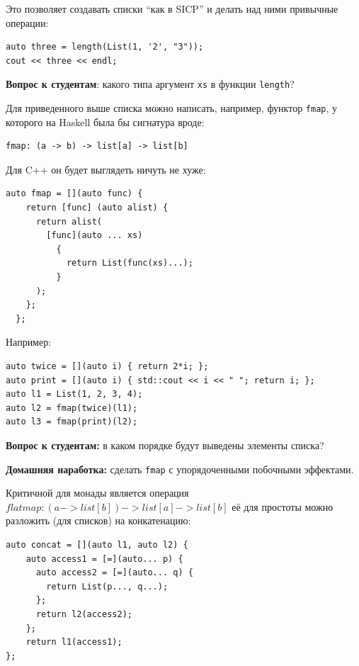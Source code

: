 \documentclass[a4paper,12pt,oneside]{article}
\newif\ifanswers
\begin{document}
Это позволяет создавать списки ``как в SICP'' и делать над ними привычные операции:

\begin{lstlisting}
auto three = length(List(1, '2', "3")); 
cout << three << endl;
\end{lstlisting}

\textbf{Вопрос к студентам}: какого типа аргумент \lstinline!xs! в функции \lstinline!length!?

\ifanswers
Правильный ответ: \lstinline!std::function!
\fi

Для приведенного выше списка можно написать, например, функтор \lstinline!fmap!, у которого на Haskell была бы сигнатура вроде:

\begin{verbatim}
fmap: (a -> b) -> list[a] -> list[b]
\end{verbatim}

Для C++ он будет выглядеть ничуть не хуже:

\begin{lstlisting}
auto fmap = [](auto func) {
    return [func] (auto alist) {
      return alist(
        [func](auto ... xs)
          {
            return List(func(xs)...);  
          }
      );
    };
  };
\end{lstlisting}

Например:

\begin{lstlisting}
auto twice = [](auto i) { return 2*i; };
auto print = [](auto i) { std::cout << i << " "; return i; };
auto l1 = List(1, 2, 3, 4);
auto l2 = fmap(twice)(l1);
auto l3 = fmap(print)(l2);
\end{lstlisting}

\textbf{Вопрос к студентам:} в каком порядке будут выведены элементы списка?

\ifanswers
Правильный ответ: практически в любом. Внутри \lstinline!fmap! будет сгенерирован вызов конструктора списка, который берет на вход вызовы функций вывода.
\fi

\textbf{Домашняя наработка:} сделать \lstinline!fmap! с упорядоченными побочными эффектами.

Критичной для монады является операция $flatmap: (a -> list[b]) -> list[a] -> list[b]$ её для простоты можно разложить (для списков) на конкатенацию:

\begin{lstlisting}
auto concat = [](auto l1, auto l2) {
    auto access1 = [=](auto... p) {
      auto access2 = [=](auto... q) {
        return List(p..., q...);
      };
      return l2(access2);
    };
    return l1(access1);
};
\end{lstlisting}
\end{document}
